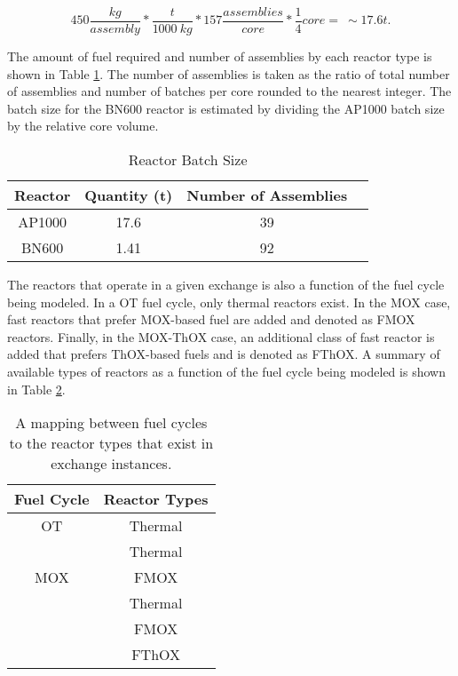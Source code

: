 \begin{equation}
   450 \frac{kg}{assembly} * \frac{t}{1000 \: kg} * 157 \frac{assemblies}{core}
   * \frac{1}{4} core = \: \sim 17.6 t.
\end{equation}

The amount of fuel required and number of assemblies by each reactor type is
shown in Table \ref{tbl:rxtr_batch}. The number of assemblies is taken as the
ratio of total number of assemblies and number of batches per core rounded to
the nearest integer. The batch size for the BN600 reactor is estimated by
dividing the AP1000 batch size by the relative core volume.

\begin{table}[h]
\centering
\caption{Reactor Batch Size}
\label{tbl:rxtr_batch}
\begin{tabular}{|c|c|c|c|}
\hline
Reactor & Quantity (t) & Number of Assemblies \\ \hline
AP1000  & 17.6          & 39 \\ \hline
BN600   & 1.41          & 92 \\ \hline
\end{tabular}
\end{table}

The reactors that operate in a given exchange is also a function of the fuel
cycle being modeled. In a OT fuel cycle, only thermal reactors exist. In the MOX
case, fast reactors that prefer MOX-based fuel are added and denoted as FMOX
reactors. Finally, in the MOX-ThOX case, an additional class of fast reactor is
added that prefers ThOX-based fuels and is denoted as FThOX. A summary of
available types of reactors as a function of the fuel cycle being modeled is
shown in Table \ref{tbl:fc_to_rxtrs}. 

\begin{table}[h]
\centering
\caption{A mapping between fuel cycles to the reactor types that exist in exchange instances.}
\label{tbl:fc_to_rxtrs}
\begin{tabular}{|c|c|}
\hline
Fuel Cycle            & Reactor Types \\ \hline
OT                    & Thermal         \\ \hline
\multirow{3}{*}{MOX}  & Thermal         \\  
                      & FMOX        \\ \hline
\multirow{4}{*}{ThOX} & Thermal         \\  
                      & FMOX        \\  
                      & FThOX       \\ \hline
\end{tabular}
\end{table}

